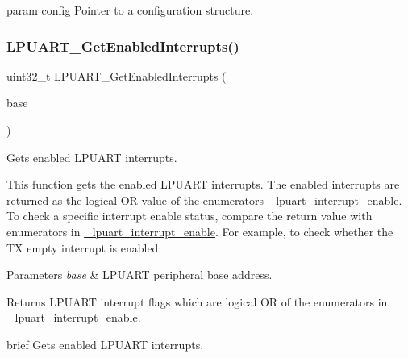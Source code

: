 param config Pointer to a configuration structure. \mbox{\label{group__lpuart__driver_ga172b524bae8bacc6dc95d9daf82c97b5}} 
\subsubsection{\texorpdfstring{LPUART\_GetEnabledInterrupts()}{LPUART\_GetEnabledInterrupts()}}
{\footnotesize\ttfamily uint32\+\_\+t L\+P\+U\+A\+R\+T\+\_\+\+Get\+Enabled\+Interrupts (\begin{DoxyParamCaption}\item[{\mbox{\hyperlink{struct_l_p_u_a_r_t___type}{L\+P\+U\+A\+R\+T\+\_\+\+Type}} $\ast$}]{base }\end{DoxyParamCaption})}



Gets enabled L\+P\+U\+A\+RT interrupts. 

This function gets the enabled L\+P\+U\+A\+RT interrupts. The enabled interrupts are returned as the logical OR value of the enumerators \mbox{\hyperlink{group__lpuart__driver_ga199a157d391291a9d003bf23954f9603}{\+\_\+lpuart\+\_\+interrupt\+\_\+enable}}. To check a specific interrupt enable status, compare the return value with enumerators in \mbox{\hyperlink{group__lpuart__driver_ga199a157d391291a9d003bf23954f9603}{\+\_\+lpuart\+\_\+interrupt\+\_\+enable}}. For example, to check whether the TX empty interrupt is enabled\+: 
\begin{DoxyCode}{0}
\DoxyCodeLine{}
\DoxyCodeLine{\{}
\DoxyCodeLine{\}}
\end{DoxyCode}



\begin{DoxyParams}{Parameters}
{\em base} & L\+P\+U\+A\+RT peripheral base address. \\
\hline
\end{DoxyParams}
\begin{DoxyReturn}{Returns}
L\+P\+U\+A\+RT interrupt flags which are logical OR of the enumerators in \mbox{\hyperlink{group__lpuart__driver_ga199a157d391291a9d003bf23954f9603}{\+\_\+lpuart\+\_\+interrupt\+\_\+enable}}.
\end{DoxyReturn}
brief Gets enabled L\+P\+U\+A\+RT interrupts.

